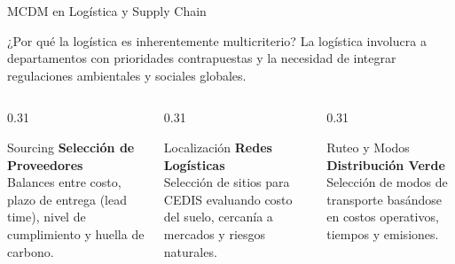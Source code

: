 \documentclass[aspectratio=169, 10pt]{beamer}
\begin{document}
\begin{frame}{MCDM en Logística y Supply Chain}
    \begin{exampleblock}{¿Por qué la logística es inherentemente multicriterio?}
        La logística involucra a departamentos con prioridades contrapuestas y la necesidad de integrar regulaciones ambientales y sociales globales.
    \end{exampleblock}
    \begin{columns}[T]
        \begin{column}{0.31\textwidth}
            \begin{block}{Sourcing}
                \scriptsize
                \textbf{Selección de Proveedores}\\
                Balances entre costo, plazo de entrega (lead time), nivel de cumplimiento y huella de carbono.
            \end{block}
        \end{column}
        
        \begin{column}{0.31\textwidth}
            \begin{block}{Localización}
                \scriptsize
                \textbf{Redes Logísticas}\\
                Selección de sitios para CEDIS evaluando costo del suelo, cercanía a mercados y riesgos naturales.
            \end{block}
        \end{column}
        
        \begin{column}{0.31\textwidth}
            \begin{block}{Ruteo y Modos}
                \scriptsize
                \textbf{Distribución Verde}\\
                Selección de modos de transporte basándose en costos operativos, tiempos y emisiones.
            \end{block}
        \end{column}
    \end{columns}
\end{frame}
\end{document}
